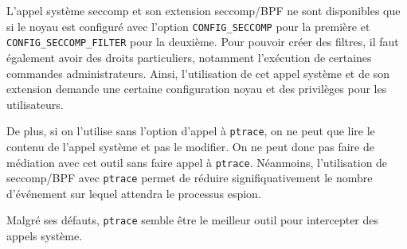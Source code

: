L'appel système seccomp et son extension seccomp/BPF ne sont disponibles que si
le noyau est configuré avec l'option \texttt{CONFIG\_SECCOMP} pour la première
et \texttt{CONFIG\_SECCOMP\_FILTER} pour la deuxième. Pour pouvoir créer des
filtres, il faut également avoir des droits particuliers, notamment l'exécution
de certaines commandes administrateurs. Ainsi, l'utilisation de cet appel
système et de son extension demande une certaine configuration noyau et des
privilèges pour les utilisateurs.

De plus, si on l'utilise sans l'option d'appel à \texttt{ptrace}, on ne peut que
lire le contenu de l'appel système et pas le modifier. On ne peut donc pas faire
de médiation avec cet outil sans faire appel à \texttt{ptrace}. Néanmoins,
l'utilisation de seccomp/BPF avec \texttt{ptrace} permet de réduire
signifiquativement le nombre d'événement sur lequel attendra le processus
espion.
\vspace{0.5cm}

Malgré ses défauts, \texttt{ptrace} semble être le meilleur outil pour intercepter des appels système.

